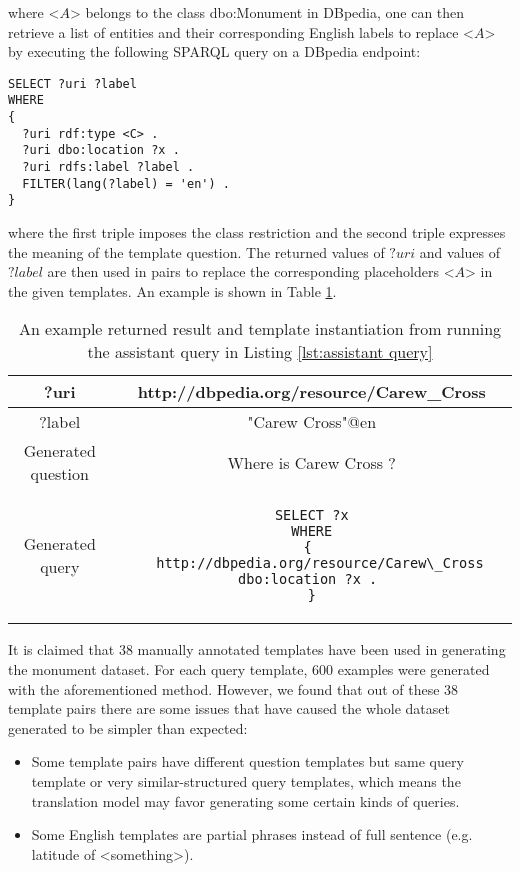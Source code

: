 where <$ A $> belongs to the class dbo:Monument in DBpedia, one can then retrieve a list of entities and their corresponding English labels to replace <$ A $> by executing the following SPARQL query on a DBpedia endpoint:
\begin{lstlisting}[language=SPARQL, caption={An assistant query to retrieve a list of entities and labels to fill a template pair}, label={lst:assistant query}]
SELECT ?uri ?label
WHERE
{ 
  ?uri rdf:type <C> .
  ?uri dbo:location ?x . 
  ?uri rdfs:label ?label .
  FILTER(lang(?label) = 'en') .
}
\end{lstlisting}
where the first triple imposes the class restriction and the second triple expresses the meaning of the template question. The returned values of $ ?uri $ and values of $ ?label $ are then used in pairs to replace the corresponding placeholders <$ A $> in the given templates. An example is shown in Table \ref{table:example result generation}.

\begin{table}[H]
\centering
\caption{An example returned result and template instantiation from running the assistant query in Listing \ref{lst:assistant query}}
\label{table:example result generation}
\begin{tabular}{c|c}
?uri & http://dbpedia.org/resource/Carew\_Cross  \\
\hline
?label & "Carew Cross"@en \\
\hline
Generated question & Where is Carew Cross ? \\
\hline
Generated query & \begin{lstlisting}[language=SPARQL]
SELECT ?x
WHERE
{ 
  http://dbpedia.org/resource/Carew\_Cross dbo:location ?x . 
}
\end{lstlisting}
\end{tabular}
\end{table}


It is claimed \cite{Soru2018a} that 38 manually annotated templates have been used in generating the monument dataset. For each query template, 600 examples were generated with the aforementioned method. However, we found that out of these 38 template pairs there are some issues that have caused the whole dataset generated to be simpler than expected:
\begin{itemize}
\item Some template pairs have different question templates but same query template or very similar-structured query templates, which means the translation model may favor generating some certain kinds of queries.
\item Some English templates are partial phrases instead of full sentence (e.g. latitude of <something>).
\end{itemize}


